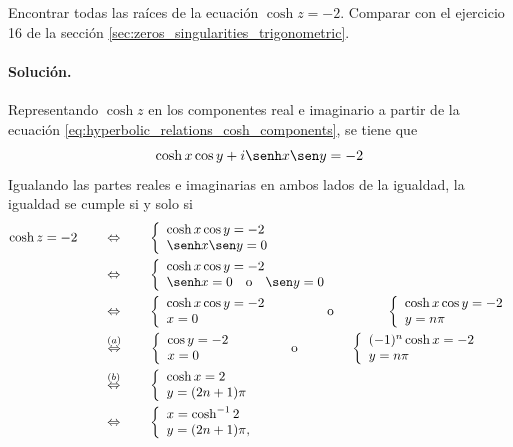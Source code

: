 \documentclass[a4paper]{report}
\begin{document}
Encontrar todas las raíces de la ecuación \(\cosh z=-2\). Comparar con el ejercicio 16 de la sección \ref{sec:zeros_singularities_trigonometric}.

\paragraph{Solución.} Representando \(\cosh z\) en los componentes real e imaginario a partir de la ecuación \ref{eq:hyperbolic_relations_cosh_components}, se tiene que 
\[
 \cosh x\cos y+i\senh x\sen y=-2
\]
Igualando las partes reales e imaginarias en ambos lados de la igualdad, la igualdad se cumple si y solo si
\begin{align*}
 \cosh z=-2
 \qquad&\Leftrightarrow\qquad
  \left\{ 
  \begin{array}{l}
   \cosh x\cos y=-2\\
   \senh x\sen y=0
  \end{array}\right.\\
 \qquad&\Leftrightarrow\qquad
  \left\{ 
  \begin{array}{l}
   \cosh x\cos y=-2\\
   \senh x=0\quad\textrm{o}\quad\sen y=0
  \end{array}\right.\\
  \qquad&\Leftrightarrow\qquad
  \left\{ 
  \begin{array}{l}
   \cosh x\cos y=-2\\
   x=0
  \end{array}\right.
  \qquad\qquad\textrm{o}\qquad\qquad
  \left\{ 
  \begin{array}{l}
   \cosh x\cos y=-2\\
   y=n\pi
  \end{array}\right.\\
  \qquad&\overset{(a)}{\Leftrightarrow}\qquad
  \left\{ 
  \begin{array}{l}
   \cos y=-2\\
   x=0
  \end{array}\right.
  \qquad\qquad\textrm{o}\qquad\qquad
  \left\{ 
  \begin{array}{l}
   (-1)^n\cosh x=-2\\
   y=n\pi
  \end{array}\right.\\
  \qquad&\overset{(b)}{\Leftrightarrow}\qquad
  \left\{ 
  \begin{array}{l}
   \cosh x=2\\
   y=(2n+1)\pi
  \end{array}\right.\\
  \qquad&\Leftrightarrow\qquad
  \left\{ 
  \begin{array}{l}
   x=\cosh^{-1}2\\
   y=(2n+1)\pi,
  \end{array}\right.
\end{align*}
\end{document}
